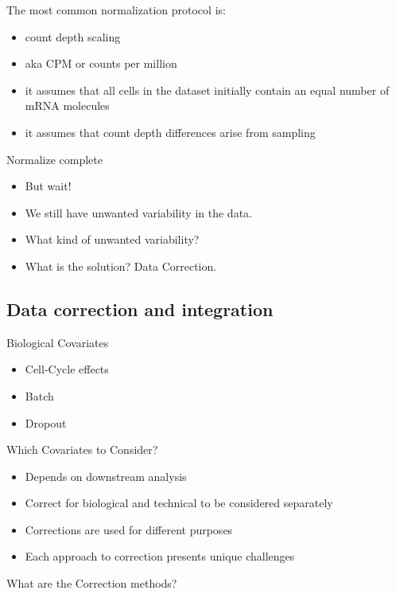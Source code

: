 \documentclass[
]{book}
\providecommand{\tightlist}{%
  \setlength{\itemsep}{0pt}\setlength{\parskip}{0pt}}
\begin{document}
The most common normalization protocol is:

\begin{itemize}
\tightlist
\item
  count depth scaling
\item
  aka CPM or counts per million
\item
  it assumes that all cells in the dataset initially contain an equal number of mRNA molecules
\item
  it assumes that count depth differences arise from sampling
\end{itemize}

Normalize complete

\begin{itemize}
\tightlist
\item
  But wait!
\item
  We still have unwanted variability in the data.
\item
  What kind of unwanted variability?
\item
  What is the solution? Data Correction.
\end{itemize}

\hypertarget{data-correction-and-integration}{%
\subsection{Data correction and integration}\label{data-correction-and-integration}}

Biological Covariates

\begin{itemize}
\tightlist
\item
  Cell-Cycle effects
\item
  Batch
\item
  Dropout
\end{itemize}

Which Covariates to Consider?

\begin{itemize}
\tightlist
\item
  Depends on downstream analysis
\item
  Correct for biological and technical to be considered separately
\item
  Corrections are used for different purposes
\item
  Each approach to correction presents unique challenges
\end{itemize}

What are the Correction methods?
\end{document}
